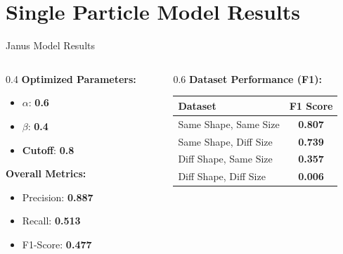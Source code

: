 \section[Single Particle Results]{Single Particle Model Results}

\begin{frame}{Janus Model Results}
    \begin{columns}
        \begin{column}{0.4\textwidth}
            \textbf{Optimized Parameters:}
            \begin{itemize}
                \item $\alpha$: \textbf{0.6}
                \item $\beta$: \textbf{0.4}
                \item \textbf{Cutoff}: \textbf{0.8}
            \end{itemize}
            
            \vspace{0.5cm}
            \textbf{Overall Metrics:}
            \begin{itemize}
                \item Precision: \textbf{0.887}
                \item Recall: \textbf{0.513}
                \item F1-Score: \textbf{0.477}
            \end{itemize}
        \end{column}
        
        \begin{column}{0.6\textwidth}
            \textbf{Dataset Performance (F1):}
            \begin{table}[]
                \begin{tabular}{|l|c|}
                \hline
                \textbf{Dataset} & \textbf{F1 Score} \\ \hline
                Same Shape, Same Size & \textbf{0.807} \\ \hline
                Same Shape, Diff Size & \textbf{0.739} \\ \hline
                Diff Shape, Same Size & \textbf{0.357} \\ \hline
                Diff Shape, Diff Size & \textbf{0.006} \\ \hline
                \end{tabular}
            \end{table}
        \end{column}
    \end{columns}
\end{frame}

